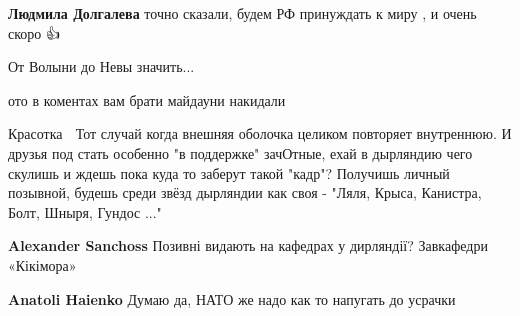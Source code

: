 \begin{itemize}
\begin{itemize}
\textbf{Людмила Долгалева} точно сказали, будем РФ принуждать к миру , и очень скоро 👍👏

\end{itemize}

 
От Волыни до Невы значить...

 
ото в коментах вам брати майдауни накидали

 

Красотка \Smiley[1.0][yellow]\Laughey[1.0][white]🤢 Тот случай когда внешняя оболочка целиком повторяет внутреннюю.
\Laughey[1.0][white] И друзья под стать особенно "в поддержке" зачОтные, ехай в дырляндию чего
скулишь и ждешь пока куда то заберут такой "кадр"? Получишь личный позывной,
будешь среди звёзд дырляндии как своя - "Ляля, Крыса, Канистра, Болт, Шныря,
Гундос ..." \Laughey[1.0][white]

\begin{itemize}
 
\textbf{Alexander Sanchoss} Позивні видають на кафедрах у дирляндії? Завкафедри «Кікімора»

 
\textbf{Anatoli Haienko} Думаю да, НАТО же надо как то напугать до усрачки\Laughey[1.0][white]


\end{itemize}
\end{itemize}
